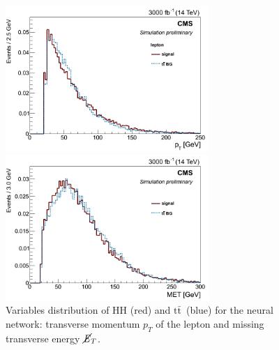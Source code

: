 \documentclass[10pt,a4paper]{article}
\newcommand{\ww}{7.7cm} %
\newcommand{\dd}{-2mm} %
\renewcommand{\tt}{\ensuremath{\text{t}\bar{\text{t}}}}
\newcommand{\MET}{$\cancel{\it{E}}_{T}$}
\begin{document}
\begin{figure}[h]
    \begin{minipage}[h!]{\ww}
      \centering
      \includegraphics[width=\ww]{figs/leptonPt.png}
    \end{minipage}
    \begin{minipage}[h!]{\ww}
      \centering
      \includegraphics[width=\ww]{figs/MET.png}
    \end{minipage}
  \vspace{\dd}
  \caption{Variables distribution of HH (red) and \tt\ (blue) for the neural network: transverse momentum $p_T$ of the lepton and missing transverse energy \MET.} \label{vars1}
\end{figure}
\end{document}
